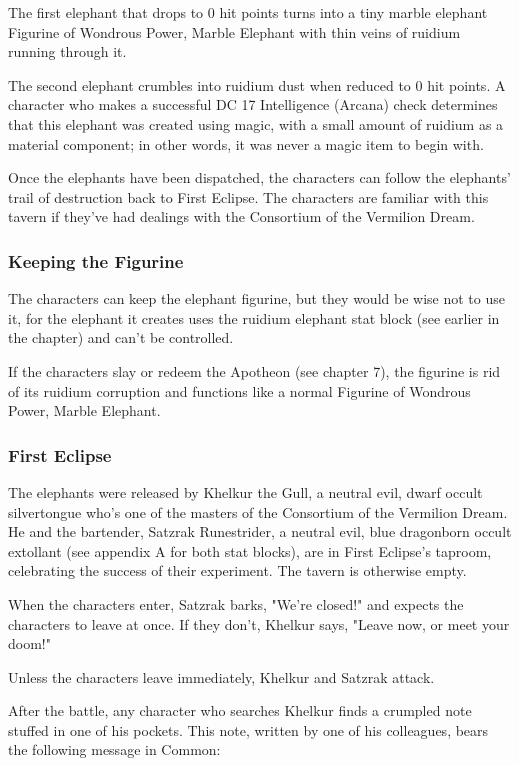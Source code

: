 \documentclass[10pt,a4paper,twoside,twocolumn,openany,nodeprecatedcode]{dndbook}
\begin{document}
The first elephant that drops to 0 hit points turns into a tiny marble elephant Figurine of Wondrous Power, Marble Elephant with thin veins of ruidium running through it.

The second elephant crumbles into ruidium dust when reduced to 0 hit points. A character who makes a successful DC 17 Intelligence (Arcana) check determines that this elephant was created using magic, with a small amount of ruidium as a material component; in other words, it was never a magic item to begin with.

Once the elephants have been dispatched, the characters can follow the elephants' trail of destruction back to First Eclipse. The characters are familiar with this tavern if they've had dealings with the Consortium of the Vermilion Dream.

\subsubsection{Keeping the Figurine}
The characters can keep the elephant figurine, but they would be wise not to use it, for the elephant it creates uses the ruidium elephant stat block (see earlier in the chapter) and can't be controlled.

If the characters slay or redeem the Apotheon (see chapter 7), the figurine is rid of its ruidium corruption and functions like a normal Figurine of Wondrous Power, Marble Elephant.

\subsubsection{First Eclipse}
The elephants were released by Khelkur the Gull, a neutral evil, dwarf occult silvertongue who's one of the masters of the Consortium of the Vermilion Dream. He and the bartender, Satzrak Runestrider, a neutral evil, blue dragonborn occult extollant (see appendix A for both stat blocks), are in First Eclipse's taproom, celebrating the success of their experiment. The tavern is otherwise empty.

When the characters enter, Satzrak barks, "We're closed!" and expects the characters to leave at once. If they don't, Khelkur says, "Leave now, or meet your doom!"

Unless the characters leave immediately, Khelkur and Satzrak attack.

After the battle, any character who searches Khelkur finds a crumpled note stuffed in one of his pockets. This note, written by one of his colleagues, bears the following message in Common:
\end{document}
